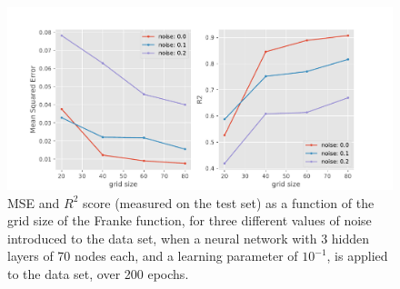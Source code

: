 \begin{figure}
    \centering
    \includegraphics[scale=0.65]{Figures/Regression/grid-mse-analysis7.pdf}
    \caption{MSE and $R^2$ score (measured on the test set) as a function of the grid size of the Franke function, for three different values of noise introduced to the data set, when a neural network with 3 hidden layers of 70 nodes each, and a learning parameter of $10^{-1}$, is applied to the data set, over 200 epochs.}
    \label{fig:regression_gridsize}
\end{figure}